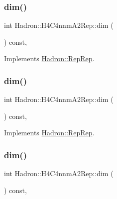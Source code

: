 \subsubsection{\texorpdfstring{dim()}{dim()}\hspace{0.1cm}{\footnotesize\ttfamily [3/5]}}
{\footnotesize\ttfamily int Hadron\+::\+H4\+C4nnm\+A2\+Rep\+::dim (\begin{DoxyParamCaption}{ }\end{DoxyParamCaption}) const\hspace{0.3cm}{\ttfamily [inline]}, {\ttfamily [virtual]}}



Implements \mbox{\hyperlink{structHadron_1_1RepRep_a92c8802e5ed7afd7da43ccfd5b7cd92b}{Hadron\+::\+Rep\+Rep}}.

\mbox{\label{structHadron_1_1H4C4nnmA2Rep_a70814b73063ca353305cb82be8dd8b74}} 
\subsubsection{\texorpdfstring{dim()}{dim()}\hspace{0.1cm}{\footnotesize\ttfamily [4/5]}}
{\footnotesize\ttfamily int Hadron\+::\+H4\+C4nnm\+A2\+Rep\+::dim (\begin{DoxyParamCaption}{ }\end{DoxyParamCaption}) const\hspace{0.3cm}{\ttfamily [inline]}, {\ttfamily [virtual]}}



Implements \mbox{\hyperlink{structHadron_1_1RepRep_a92c8802e5ed7afd7da43ccfd5b7cd92b}{Hadron\+::\+Rep\+Rep}}.

\mbox{\label{structHadron_1_1H4C4nnmA2Rep_a70814b73063ca353305cb82be8dd8b74}} 
\subsubsection{\texorpdfstring{dim()}{dim()}\hspace{0.1cm}{\footnotesize\ttfamily [5/5]}}
{\footnotesize\ttfamily int Hadron\+::\+H4\+C4nnm\+A2\+Rep\+::dim (\begin{DoxyParamCaption}{ }\end{DoxyParamCaption}) const\hspace{0.3cm}{\ttfamily [inline]}, {\ttfamily [virtual]}}



